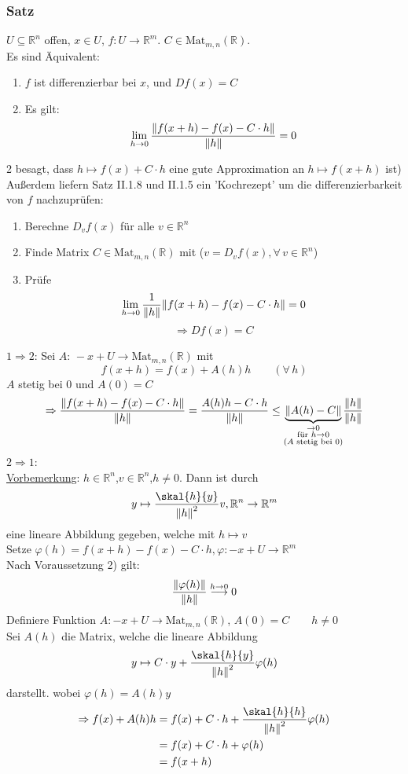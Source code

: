 \subsubsection{Satz} %
\label{ssub:satz}
$U \subseteq \mathbb{R}^n$ offen, $x \in U$, $f:U \to \mathbb{R}^m$. $C \in \text{Mat}_{m,n}(\mathbb{R})$.\\ Es sind Äquivalent:
\begin{enumerate}
	\item $f$ ist differenzierbar bei $x$, und $Df(x)=C$
	\item Es gilt:
	\[
		\lim_{h \to 0} \frac{\norm{f(x+h)-f(x)-C \cdot h}}{\norm{h}} = 0
	\]
\end{enumerate}
2 besagt, dass $h \mapsto f(x)+C \cdot h$ eine gute Approximation an $h \mapsto f(x+h)$ ist) \\
Außerdem liefern Satz II.1.8 und II.1.5 ein 'Kochrezept' um die differenzierbarkeit von $f$ nachzuprüfen:
 \begin{enumerate}
 	\item Berechne $D_{v}f(x)$ für alle $v \in \mathbb{R}^n$
	\item Finde Matrix $C \in \text{Mat}_{m,n}(\mathbb{R})$ mit ($v=D_vf(x),\forall\, v \in \mathbb{R}^n$)
	\item Prüfe \[
		\lim_{h \to 0} \frac{1}{\norm{h}}\norm{f(x+h)-f(x)-C \cdot h}=0
	\]
	\[
		\Rightarrow Df(x)=C
	\]
 \end{enumerate}
 
 \underline{$1 \Rightarrow 2$}: Sei $A: \,-x+U \to \text{Mat}_{m,n}(\mathbb{R})$ mit
 \[
 	f(x+h)=f(x)+A(h)h \qquad (\forall\, h)
 \]
 $A$ stetig bei $0$ und $A(0)=C$
 \[
 	\Rightarrow \frac{\norm{f(x+h)-f(x)-C \cdot h}}{\norm{h}}= \frac{A(h)h-C \cdot h}{\norm{h}} \leq \underset{\substack{\to 0 \\ \text{für }h \to 0 \\ \text{($A$ stetig bei }0)}}{\underbrace{\norm{A(h)-C}}} \frac{\norm{h}}{\norm{h}}
 \]
\underline{$2 \Rightarrow 1$}: \\
\underline{Vorbemerkung}: $h \in \mathbb{R}^n$,$v \in \mathbb{R}^n$,$h \neq 0$. Dann ist durch 
\[
	y \mapsto \frac{\skal{h}{y}}{\norm{h}^2}v , \mathbb{R}^n \to \mathbb{R}^m 
\]
eine lineare Abbildung gegeben, welche mit $h \mapsto v$ \\
Setze $\varphi (h) = f(x+h)-f(x)-C \cdot h , \varphi: -x+U \to \mathbb{R}^m$ \\
Nach Voraussetzung 2) gilt:
\[
	\frac{\norm{\varphi(h)}}{\norm{h}} \stackrel{h \to 0}{\longrightarrow} 0 
\]
Definiere Funktion $A: -x+U \to \text{Mat}_{m,n}(\mathbb{R})$, $A(0)=C \qquad h \neq 0$\\
Sei $A(h)$ die Matrix, welche die lineare Abbildung \[
	y \mapsto C \cdot y + \frac{\skal{h}{y}}{\norm{h}^2}\varphi(h)
\]
darstellt. wobei $\varphi(h)=A(h)y$
\begin{align*}
	\Rightarrow f(x)+A(h)h &= f(x)+C \cdot h + \frac{\skal{h}{h}}{\norm{h}^2}\varphi(h) \\
	&=f(x)+C \cdot h + \varphi(h) \\
	&=f(x+h)	\\
\end{align*}

